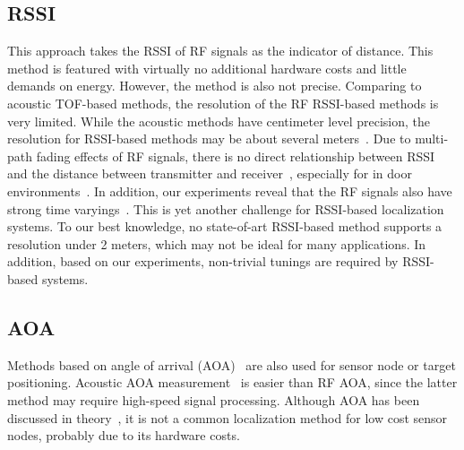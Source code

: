\subsection{RSSI}
 This approach takes the RSSI of RF signals as the indicator of distance. This method is featured with virtually no additional hardware costs and little demands on energy. However, the method is also not precise.
  Comparing to acoustic TOF-based methods, the resolution of the RF RSSI-based methods is very limited. While the acoustic methods have centimeter level precision, the resolution for RSSI-based methods may be about several meters~\cite{WelshMoteTrack_LoCA2005-PUC}.
    Due to multi-path fading effects of RF signals, there is no direct relationship between RSSI and the distance between transmitter and receiver~\cite{Polastre-telos}, especially for in door environments~\cite{WelshMoteTrack_LoCA2005-PUC}. In addition, our experiments reveal that the RF signals also have  strong time varyings~\cite{GungorICC07}. This is yet another challenge for RSSI-based localization systems.
     To our best knowledge, no state-of-art RSSI-based method supports a resolution under 2 meters, which may not be ideal for many applications. In addition, based on our experiments, non-trivial tunings are required by RSSI-based systems.

\subsection{AOA}
 Methods based on angle of arrival (AOA)~\cite{NiculescuAPSAoAInfocom03,liu02collaborative} are also used for sensor node or target positioning. Acoustic AOA measurement~\cite{liu02collaborative} is easier than RF AOA, since the latter method may require high-speed signal processing. Although AOA has been discussed in theory~\cite{NiculescuAPSAoAInfocom03}, it is not a common localization method for low cost sensor nodes, probably due to its hardware costs.


